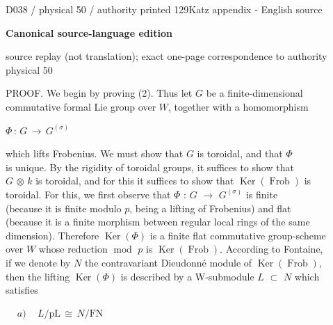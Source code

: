 \documentclass[9pt]{article}
\newcommand{\CanonText}[1]{\par{\fontsize{8.0}{9.35}\selectfont\RaggedRight #1\par}\vspace{2.2pt}}
\newcommand{\CanonDisplay}[1]{\par\vspace{1.2pt}\begin{center}{\fontsize{7.2}{8.4}\selectfont\(\displaystyle #1\)}\end{center}\vspace{1.2pt}}
\newenvironment{CanonMathBlock}{\par\vspace{1.2pt}\begin{center}\fontsize{6.8}{8.0}\selectfont\(\displaystyle}{\)\end{center}\vspace{1.2pt}}
\newcommand{\LayerTitle}{Canonical source-language edition}
\begin{document}
\noindent\begin{minipage}[t][\dimexpr\textheight-5pt\relax][t]{\textwidth}
{\sffamily\fontsize{7.3}{8.2}\selectfont\color{Quiet} D038 / physical 50 / authority printed 129\hfill Katz appendix - English source}
\par{}\vspace{4.5pt}
{\sffamily\fontsize{10.4}{11.6}\selectfont\bfseries\color{Accent} \LayerTitle}
\par{\sffamily\fontsize{6.7}{7.7}\selectfont\color{Quiet} source replay (not translation); exact one-page correspondence to authority physical 50}
\vspace{5pt}
\CanonText{PROOF. We begin by proving (2). Thus let \(G\) be a finite-dimensional\\commutative formal Lie group over \(W\), together with a homomorphism}
\CanonDisplay{\Phi{}\,:\,G\,\to{}\,G^{(\sigma{})}}
\CanonText{which lifts Frobenius. We must show that \(G\) is toroidal, and that \(\Phi{}\)\\is unique. By the rigidity of toroidal groups, it suffices to show that\\\(G\) \(\otimes{}\) \(k\) is toroidal, and for this it suffices to show that \(\operatorname{Ker}(\operatorname{Frob})\) is\\toroidal. For this, we first observe that \(\Phi{}\) : \(G\) \(\to{}\) \(G^{(\sigma{})}\) is finite\\(because it is finite modulo \(p\), being a lifting of Frobenius) and flat\\(because it is a finite morphism between regular local rings of the same\\dimension). Therefore \(\operatorname{Ker}(\Phi{})\) is a finite flat commutative group-scheme\\over \(W\) whose reduction \(\operatorname{mod}\) \(p\) is \(\operatorname{Ker}(\operatorname{Frob})\). According to Fontaine,\\if we denote by \(N\) the contravariant Dieudonné module of \(\operatorname{Ker}(\operatorname{Frob})\),\\then the lifting \(\operatorname{Ker}(\Phi{})\) is described by a W-submodule \(L\) \(\subset{}\) \(N\) which\\satisfies}
\begin{CanonMathBlock}
\begin{aligned}
& a)\quad\,L/\text{pL}\,\cong{}\,N/\mathrm{FN}\\

\end{aligned}
\end{CanonMathBlock}
\end{minipage}
\end{document}
